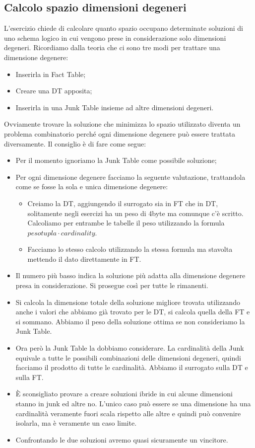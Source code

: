 \subsection{Calcolo spazio dimensioni degeneri}
L'esercizio chiede di calcolare quanto spazio occupano determinate soluzioni di uno schema logico in cui vengono prese in considerazione solo dimensioni degeneri.
\noindent Ricordiamo dalla teoria che ci sono tre modi per trattare una dimensione degenere:
\begin{itemize}
	\item Inserirla in Fact Table;
	\item Creare una DT apposita;
	\item Inserirla in una Junk Table insieme ad altre dimensioni degeneri.
\end{itemize}
Ovviamente trovare la soluzione che minimizza lo spazio utilizzato diventa un problema combinatorio perché ogni dimensione degenere può essere trattata diversamente. Il consiglio è di fare come segue:
\begin{itemize}
	\item Per il momento ignoriamo la Junk Table come possibile soluzione;
	\item Per ogni dimensione degenere facciamo la seguente valutazione, trattandola come se fosse la sola e unica dimensione degenere:
	\begin{itemize}
		\item Creiamo la DT, aggiungendo il surrogato sia in FT che in DT, solitamente negli esercizi ha un peso di 4byte ma comunque c'è scritto. Calcoliamo per entrambe le tabelle il peso utilizzando la formula $pesotupla \cdot cardinality$.
		\item Facciamo lo stesso calcolo utilizzando la stessa formula ma stavolta mettendo il dato direttamente in FT.
	\end{itemize}
	\item Il numero più basso indica la soluzione più adatta alla dimensione degenere presa in considerazione. Si prosegue così per tutte le rimanenti.
	\item Si calcola la dimensione totale della soluzione migliore trovata utilizzando anche i valori che abbiamo già trovato per le DT, si calcola quella della FT e si sommano. Abbiamo il peso della soluzione ottima se non consideriamo la Junk Table.
	\item Ora però la Junk Table la dobbiamo considerare. La cardinalità della Junk equivale a tutte le possibili combinazioni delle dimensioni degeneri, quindi facciamo il prodotto di tutte le cardinalità. Abbiamo il surrogato sulla DT e sulla FT.
	\item È sconsigliato provare a creare soluzioni ibride in cui alcune dimensioni stanno in junk ed altre no. L'unico caso può essere se una dimensione ha una cardinalità veramente fuori scala rispetto alle altre e quindi può convenire isolarla, ma è veramente un caso limite.
	\item Confrontando le due soluzioni avremo quasi sicuramente un vincitore.
\end{itemize}
